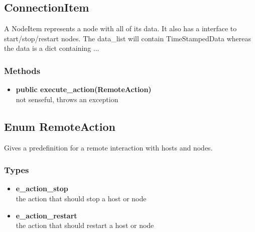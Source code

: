 \subsection{ConnectionItem}
 A NodeItem represents a node with all of its data. It also has a interface to start/stop/restart nodes.
 The data\_list will contain TimeStampedData whereas the data is a dict containing ...
\subsubsection{Methods}
\begin{itemize}
  \item \textbf{public execute\_action(RemoteAction)}\\ 
  not senseful, throws an exception
\end{itemize}


\subsection{Enum RemoteAction}
Gives a predefinition for a remote interaction with hosts and nodes.
\subsubsection{Types}
\begin{itemize}
	\item \textbf{e\_action\_stop}\\
	the action that should stop a host or node
	\item \textbf{e\_action\_restart}\\
	the action that should restart a host or node
\end{itemize}

